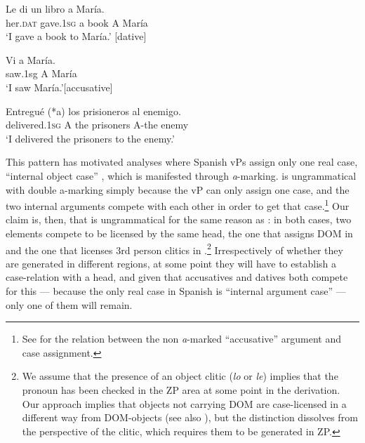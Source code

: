 \documentclass[output=paper,modfonts,nonflat,newtxmath,colorlinks,citecolor=brown]{langsci/langscibook}
\begin{document}
\ea%
    \label{ex:cabre:19}
      \ea
    \gll Le di un libro a María.\\
    {her.\textsc{dat}}   gave.\textsc{1sg}   a {book} {A} {María} \\
    \glt ‘I gave a book to María.’ \hfill [dative]
    
    \ex 
    \gll Vi a María.\\
    {saw.1sg} {A} {María}\\
    \glt  ‘I saw María.’\hfill [accusative]
    \z
    \z

\ea%
    \label{ex:cabre:20}
    \gll Entregué (*a) los prisioneros al enemigo.\\
        delivered.\textsc{1sg} A  the prisoners  A-the  enemy\\
    \glt ‘I delivered the prisoners to the enemy.’
    \z

This pattern has motivated analyses where Spanish vPs assign only one real case, ``internal object case'' \citep{Romero2012, OrmazabalRomero2013Probus}, which is manifested through \textit{a}{}-marking.  is ungrammatical with double a-marking simply because the vP can only assign one case, and the two internal arguments compete with each other in order to get that case.\footnote{See \citet{Romero2012} for the relation between the non \textit{a}{}-marked ``accusative'' argument and case assignment.}  Our claim is, then, that  is ungrammatical for the same reason as : in both cases, two elements compete to be licensed by the same head, the one that assigns DOM in  and the one that licenses 3rd person clitics in .\footnote{We assume that the presence of an object clitic (\textit{lo} or \textit{le}) implies that the pronoun has been checked in the ZP area at some point in the derivation. Our approach implies that objects not carrying DOM are case-licensed in a different way from DOM-objects (see also \citealt{López2012}), but the distinction dissolves from the perspective of the clitic, which requires them to be generated in ZP.} Irrespectively of whether they are generated in different regions, at some point they will have to establish a case-relation with a head, and given that accusatives and datives both compete for this — because the only real case in Spanish is ``internal argument case'' — only one of them will remain.  

    \z
\end{document}
